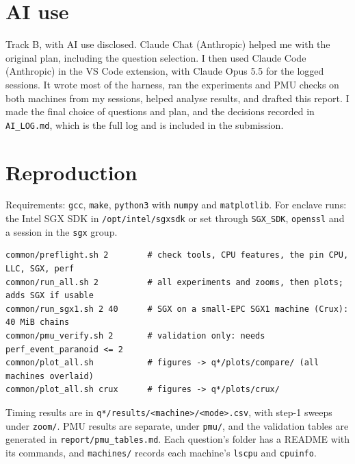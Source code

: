 \documentclass[10pt]{article}
\newcommand{\code}[1]{\texttt{#1}}
\begin{document}
\section{AI use}\label{sec:ai}
Track B, with AI use disclosed. Claude Chat (Anthropic) helped me with the original plan, including the question selection. I then used Claude Code (Anthropic) in the VS Code extension, with Claude Opus 5.5 for the logged sessions. It wrote most of the harness, ran the experiments and PMU checks on both machines
from my sessions, helped analyse results, and drafted this report. I made the final choice of questions and plan, and the decisions recorded in
\code{AI\_LOG.md}, which is the full log and is included in the submission.

\section{Reproduction}
Requirements: \code{gcc}, \code{make}, \code{python3} with \code{numpy} and \code{matplotlib}. For enclave runs: the Intel SGX SDK in \code{/opt/intel/sgxsdk} or set through \code{SGX\_SDK}, \code{openssl} and a session in the \code{sgx} group.
\begin{lstlisting}
common/preflight.sh 2        # check tools, CPU features, the pin CPU, LLC, SGX, perf
common/run_all.sh 2          # all experiments and zooms, then plots; adds SGX if usable
common/run_sgx1.sh 2 40      # SGX on a small-EPC SGX1 machine (Crux): 40 MiB chains
common/pmu_verify.sh 2       # validation only: needs perf_event_paranoid <= 2
common/plot_all.sh           # figures -> q*/plots/compare/ (all machines overlaid)
common/plot_all.sh crux      # figures -> q*/plots/crux/
\end{lstlisting}
Timing results are in \code{q*/results/<machine>/<mode>.csv}, with step-1 sweeps under \code{zoom/}. PMU results are separate, under \code{pmu/}, and the
validation tables are generated in \code{report/pmu\_tables.md}. Each question's folder has a README with its commands, and \code{machines/} records each machine's \code{lscpu} and \code{cpuinfo}.
\end{document}

